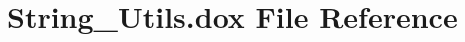 \hypertarget{_string___utils_8dox}{}\section{String\+\_\+\+Utils.\+dox File Reference}
\label{_string___utils_8dox}

